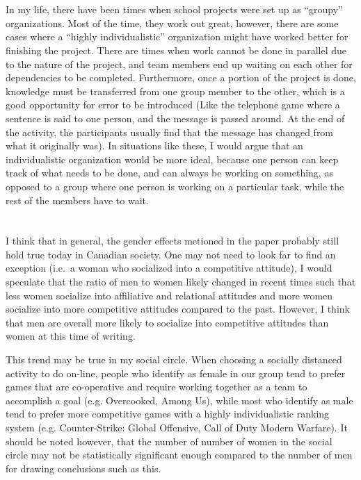 \documentclass[letterpaper,12pt]{article}
\begin{document}
  \section{}
  In my life, there have been times when school projects were set up as
  ``groupy'' organizations.  Most of the time, they work out great, however,
  there are some cases where a ``highly individualistic'' organization  might
  have worked better for finishing the project. There are times when work
  cannot be done in parallel due to the nature of the project, and team members
  end up waiting on each other for dependencies to be completed. Furthermore,
  once a portion of the project is done, knowledge must be transferred from one
  group member to the other, which is a good opportunity for error to be
  introduced (Like the telephone game where a sentence is said to one person,
  and the message is passed around. At the end of the activity, the
  participants usually find that the message has changed from what it
  originally was). In situations like these, I would argue that an
  individualistic organization would be more ideal, because one person can keep
  track of what needs to be done, and can always be working on something, as
  opposed to a group where one person is working on a particular task, while
  the rest of the members have to wait. 


  \section{}
  I think that in general, the gender effects metioned in the paper probably
  still hold true today in Canadian society. One may not need to look far to
  find an exception (i.e.\ a woman who socialized into a competitive attitude),
  I would speculate that the ratio of men to women likely changed in recent
  times such that less women socialize into affiliative and relational
  attitudes and more women socialize into more competitive attitudes compared
  to the past. However, I think that men are overall more likely to socialize
  into competitive attitudes than women at this time of writing.

  This trend may be true in my social circle.  When choosing a socially
  distanced activity to do on-line, people who identify as female in our group
  tend to prefer games that are co-operative and require working together as a
  team to accomplish a goal (e.g. Overcooked, Among Us), while most who
  identify as male tend to prefer more competitive games with a highly
  individualistic ranking system (e.g. Counter-Strike: Global Offensive, Call
  of Duty Modern Warfare). It should be noted however, that the number of
  number of women in the social circle may not be statistically significant
  enough compared to the number of men for drawing conclusions such as this. 
\end{document}
